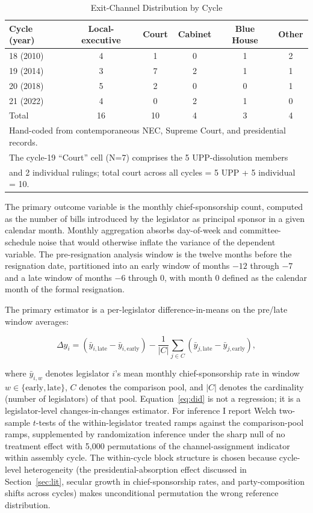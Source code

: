 \documentclass[11pt]{article}
\begin{document}
\begin{table}[H]
\centering
\caption{Exit-Channel Distribution by Cycle}
\label{tab:dictionary}
\begin{tabular}{lccccc}
\toprule
Cycle (year) & Local-executive & Court & Cabinet & Blue House & Other \\
\midrule
18 (2010) & 4 & 1 & 0 & 1 & 2 \\
19 (2014) & 3 & 7 & 2 & 1 & 1 \\
20 (2018) & 5 & 2 & 0 & 0 & 1 \\
21 (2022) & 4 & 0 & 2 & 1 & 0 \\
\midrule
Total & 16 & 10 & 4 & 3 & 4 \\
\bottomrule
\multicolumn{6}{l}{\footnotesize Hand-coded from contemporaneous NEC, Supreme Court, and presidential records.} \\
\multicolumn{6}{l}{\footnotesize The cycle-19 ``Court'' cell (N=7) comprises the 5 UPP-dissolution members} \\
\multicolumn{6}{l}{\footnotesize and 2 individual rulings; total court across all cycles = 5 UPP + 5 individual = 10.} \\
\end{tabular}
\end{table}

The primary outcome variable is the monthly chief-sponsorship count, computed as the number of bills introduced by the legislator as principal sponsor in a given calendar month. Monthly aggregation absorbs day-of-week and committee-schedule noise that would otherwise inflate the variance of the dependent variable. The pre-resignation analysis window is the twelve months before the resignation date, partitioned into an early window of months $-12$ through $-7$ and a late window of months $-6$ through $0$, with month $0$ defined as the calendar month of the formal resignation.

The primary estimator is a per-legislator difference-in-means on the pre/late window averages:

\begin{equation}
\Delta y_i = (\bar{y}_{i,\text{late}} - \bar{y}_{i,\text{early}}) - \frac{1}{|C|}\sum_{j \in C}(\bar{y}_{j,\text{late}} - \bar{y}_{j,\text{early}}),
\label{eq:did}
\end{equation}

where $\bar{y}_{i,w}$ denotes legislator $i$'s mean monthly chief-sponsorship rate in window $w \in \{\text{early}, \text{late}\}$, $C$ denotes the comparison pool, and $|C|$ denotes the cardinality (number of legislators) of that pool. Equation~\eqref{eq:did} is not a regression; it is a legislator-level changes-in-changes estimator. For inference I report Welch two-sample $t$-tests of the within-legislator treated ramps against the comparison-pool ramps, supplemented by randomization inference under the sharp null of no treatment effect with 5{,}000 permutations of the channel-assignment indicator within assembly cycle. The within-cycle block structure is chosen because cycle-level heterogeneity (the presidential-absorption effect discussed in Section~\ref{sec:lit}, secular growth in chief-sponsorship rates, and party-composition shifts across cycles) makes unconditional permutation the wrong reference distribution.
\end{document}
